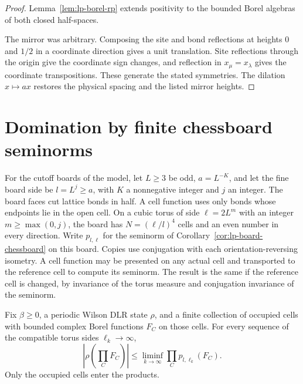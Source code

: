\documentclass[11pt,letterpaper,reqno]{amsart}
\makeatletter
\numberwithin{equation}{section}
\theoremstyle{definition}
\newcommand{\ms@majorstart}{%
  \pushQED{\qed}\renewcommand{\qedsymbol}{$\blacksquare\square$}}
\newenvironment{theorem}[1][]{\ms@majorstart\ms@theorem[#1]}
  {\popQED\endms@theorem}
\theoremstyle{remark}
\makeatother
\begin{document}
\begin{proof}
Lemma~\ref{lem:lp-borel-rp} extends positivity to the bounded
Borel algebras of both closed half-spaces.

The mirror was arbitrary. Composing the site and bond reflections
at heights \(0\) and \(1/2\) in a coordinate direction gives a
unit translation. Site reflections through the origin give the
coordinate sign changes, and reflection in \(x_\mu=x_\lambda\)
gives the coordinate transpositions. These generate the stated
symmetries. The dilation \(x\mapsto ax\) restores the physical
spacing and the listed mirror heights.
\end{proof}

\section{Domination by finite chessboard seminorms}\label{lp:sec-board-domination}

For the cutoff boards of the model, let \(L\ge3\) be odd,
\(a=L^{-K}\), and let the fine board side be \(l=L^j\ge a\),
with \(K\) a nonnegative integer and \(j\) an integer. The
board faces cut lattice bonds in half. A cell function uses
only bonds whose endpoints lie in the open cell. On a cubic
torus of side \(\ell=2L^m\) with an integer \(m\ge\max(0,j)\), the
board has \(N=(\ell/l)^4\) cells and an even number in every
direction. Write \(p_{l,\ell}\) for the seminorm of
Corollary~\ref{cor:lp-board-chessboard} on this board.
Copies use conjugation with each orientation-reversing
isometry. A cell function may be presented on any actual
cell and transported to the reference cell to compute its
seminorm. The result is the same if the reference cell is
changed, by invariance of the torus measure and conjugation
invariance of the seminorm.

\begin{samepage}
\begin{theorem}[Fixed-spacing chessboard domination]\label{thm:lp-board-domination}
Fix \(\beta\ge0\), a periodic Wilson DLR state \(\rho\), and a
finite collection of occupied cells with bounded complex Borel
functions \(F_C\) on those cells. For every sequence of the
compatible torus sides \(\ell_k\to\infty\),
\begin{equation}\label{eq:lp-board-domination}
 \left|\rho\!\left(\prod_C F_C\right)\right|
    \le \liminf_{k\to\infty}\prod_C p_{l,\ell_k}(F_C).
\end{equation}
Only the occupied cells enter the products.
\end{theorem}
\end{samepage}
\end{document}
